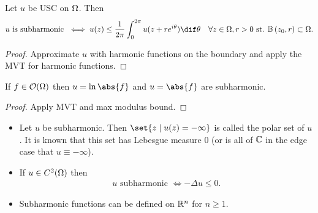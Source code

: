 \begin{theorem}
    Let $u $ be USC on $\Omega$. Then
    \begin{align*}
        u \text{ is subharmonic } \iff u(z) \leq \frac{1}{2 \pi} \int_0^{2 \pi} u(z+ re^{i \theta} ) \dif \theta \quad \forall z \in \om, r>0 \text{ st. } \ball{z_0}{r} \subset \om.
    \end{align*}
\end{theorem}
\begin{proof}
    Approximate $u$ with harmonic functions on the boundary and apply the MVT for harmonic functions.
\end{proof}

\begin{corollary}
    If $f \in \mathcal{O} (\Omega)$ then $u = \ln \abs{f}$ and $u = \abs{f}$ are subharmonic.
\end{corollary}

\begin{proof}
    Apply MVT and max modulus bound.
\end{proof}

\begin{remark}
    \phantom{.}
    \begin{itemize}
        \item Let $u$ be subharmonic. Then $\set{z \mid u(z) = - \infty}$ is called the polar set of $u$. It is known that this set has Lebesgue measure $0$ (or is all of $\mathbb{C}$ in the edge case that $u \equiv - \infty$).
        \item If $u \in C^2(\Omega) $ then
        \begin{align*}
            u \text{ subharmonic } \iff -\Delta u \leq 0.
        \end{align*}
        \item Subharmonic functions can be defined on $\mathbb{R}^n$ for $n \geq 1$.
    \end{itemize}
\end{remark}











